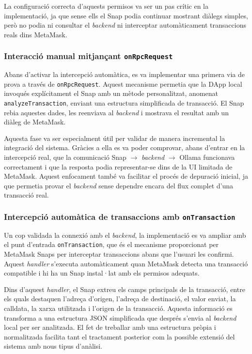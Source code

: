 La configuració correcta d’aquests permisos va ser un pas crític en la implementació, ja que sense ells el Snap podia continuar mostrant diàlegs simples, però no podia ni consultar el \textit{backend} ni interceptar automàticament transaccions reals dins MetaMask.

\subsubsection{Interacció manual mitjançant \texttt{onRpcRequest}}

Abans d’activar la intercepció automàtica, es va implementar una primera via de prova a través de \texttt{onRpcRequest}. Aquest mecanisme permetia que la DApp local invoqués explícitament el Snap amb un mètode personalitzat, anomenat \texttt{analyzeTransaction}, enviant una estructura simplificada de transacció. El Snap rebia aquestes dades, les reenviava al \textit{backend} i mostrava el resultat amb un diàleg de MetaMask.

Aquesta fase va ser especialment útil per validar de manera incremental la integració del sistema. Gràcies a ella es va poder comprovar, abans d’entrar en la intercepció real, que la comunicació Snap $\rightarrow$ \textit{backend} $\rightarrow$ Ollama funcionava correctament i que la resposta podia representar-se dins de la UI limitada de MetaMask. Aquest enfocament també va facilitar el procés de depuració inicial, ja que permetia provar el \textit{backend} sense dependre encara del flux complet d’una transacció real. 

\subsubsection{Intercepció automàtica de transaccions amb \texttt{onTransaction}}

Un cop validada la connexió amb el \textit{backend}, la implementació es va ampliar amb el punt d’entrada \texttt{onTransaction}, que és el mecanisme proporcionat per MetaMask Snaps per interceptar transaccions abans que l’usuari les confirmi. Aquest \textit{handler} s’executa automàticament quan MetaMask detecta una transacció compatible i hi ha un Snap instal·lat amb els permisos adequats. 

Dins d’aquest \textit{handler}, el Snap extreu els camps principals de la transacció, entre els quals destaquen l’adreça d’origen, l’adreça de destinació, el valor enviat, la calldata, la xarxa utilitzada i l’origen de la transacció. Aquesta informació es transforma a una estructura JSON simplificada que després s’envia al \textit{backend} local per ser analitzada. El fet de treballar amb una estructura pròpia i normalitzada facilita tant el tractament posterior com la possible extensió del sistema amb nous tipus d’anàlisi.

